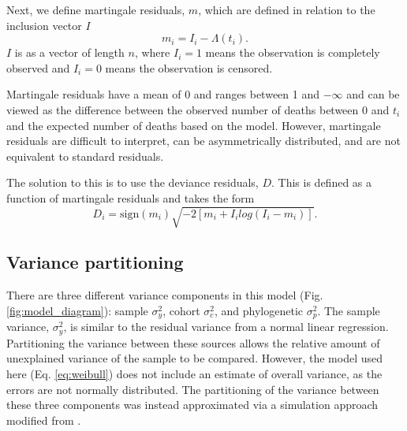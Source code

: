 \documentclass[12pt,letterpaper]{article}
\begin{document}
Next, we define martingale residuals, \(m\), which are defined in relation to the inclusion vector \(I\)
\begin{equation*}
  m_{i} = I_{i} - \Lambda(t_i).
\end{equation*}
\(I\) is as a vector of length \(n\), where \(I_{i} = 1\) means the observation is completely observed and \(I_{i} = 0\) means the observation is censored. 

Martingale residuals have a mean of 0 and ranges between 1 and \(-\infty\) and can be viewed as the difference between the observed number of deaths between 0 and \(t_{i}\) and the expected number of deaths based on the model. However, martingale residuals are difficult to interpret, can be asymmetrically distributed, and are not equivalent to standard residuals. 

The solution to this is to use the deviance residuals, \(D\). This is defined as a function of martingale residuals and takes the form
\begin{equation*}
  D_{i} = \text{sign}(m_{i}) \sqrt{-2[m_{i} + I_{i}log(I_{i} - m_{i})]}.
\end{equation*}


\subsection{Variance partitioning}
There are three different variance components in this model (Fig. \ref{fig:model_diagram}): sample \(\sigma_{y}^{2}\), cohort \(\sigma_{c}^{2}\), and phylogenetic \(\sigma_{p}^{2}\). The sample variance, \(\sigma_{y}^{2}\), is similar to the residual variance from a normal linear regression. Partitioning the variance between these sources allows the relative amount of unexplained variance of the sample to be compared. However, the model used here (Eq. \ref{eq:weibull}) does not include an estimate of overall variance, as the errors are not normally distributed. The partitioning of the variance between these three components was instead approximated via a simulation approach modified from \citet{Goldstein2002}.
\end{document}
